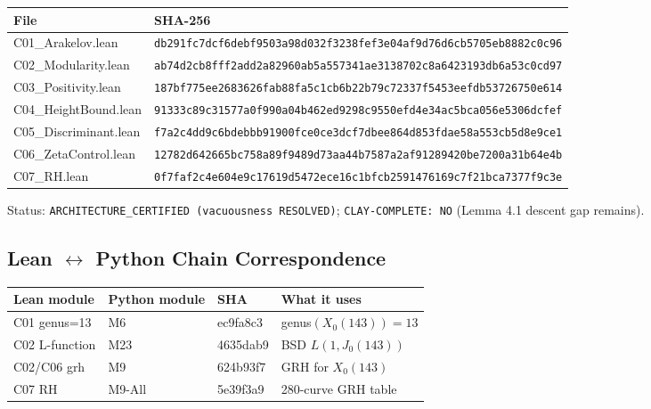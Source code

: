 \documentclass[12pt,letterpaper]{article}
\begin{document}
\begin{center}
\begin{tabular}{ll}
\toprule
File & SHA-256 \\
\midrule
C01\_Arakelov.lean &
  \texttt{db291fc7dcf6debf9503a98d032f3238fef3e04af9d76d6cb5705eb8882c0c96} \\
C02\_Modularity.lean &
  \texttt{ab74d2cb8fff2add2a82960ab5a557341ae3138702c8a6423193db6a53c0cd97} \\
C03\_Positivity.lean &
  \texttt{187bf775ee2683626fab88fa5c1cb6b22b79c72337f5453eefdb53726750e614} \\
C04\_HeightBound.lean &
  \texttt{91333c89c31577a0f990a04b462ed9298c9550efd4e34ac5bca056e5306dcfef} \\
C05\_Discriminant.lean &
  \texttt{f7a2c4dd9c6bdebbb91900fce0ce3dcf7dbee864d853fdae58a553cb5d8e9ce1} \\
C06\_ZetaControl.lean &
  \texttt{12782d642665bc758a89f9489d73aa44b7587a2af91289420be7200a31b64e4b} \\
C07\_RH.lean &
  \texttt{0f7faf2c4e604e9c17619d5472ece16c1bfcb2591476169c7f21bca7377f9c3e} \\
\bottomrule
\end{tabular}
\end{center}

Status: \texttt{ARCHITECTURE\_CERTIFIED (vacuousness RESOLVED)};
\texttt{CLAY-COMPLETE: NO} (Lemma 4.1 descent gap remains).

\subsection{Lean $\leftrightarrow$ Python Chain Correspondence}

\begin{center}
\begin{tabular}{llll}
\toprule
Lean module & Python module & SHA & What it uses \\
\midrule
C01 genus=13 & M6 & ec9fa8c3 & genus$(X_0(143)) = 13$ \\
C02 L-function & M23 & 4635dab9 & BSD $L(1, J_0(143))$ \\
C02/C06 grh & M9 & 624b93f7 & GRH for $X_0(143)$ \\
C07 RH & M9-All & 5e39f3a9 & 280-curve GRH table \\
\bottomrule
\end{tabular}
\end{center}

\newpage
\end{document}
